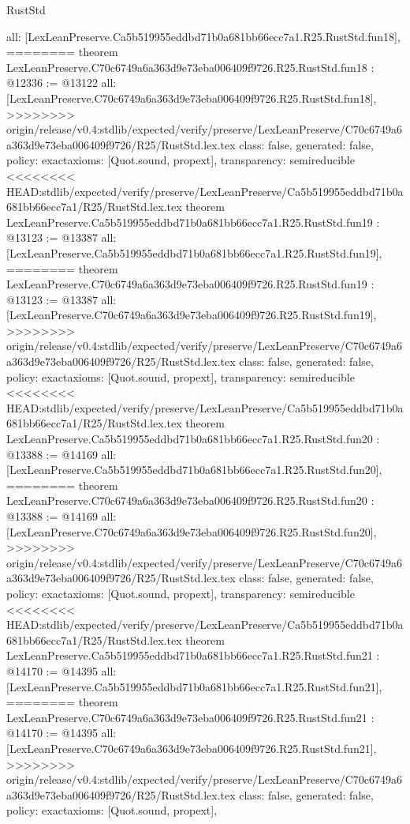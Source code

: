 \begin{lexlean}{RustStd}
\begin{coremodule}
{\begin{coremodule}
{{{{{{{{{{{{{{{{{{{{{  all: [LexLeanPreserve.Ca5b519955eddbd71b0a681bb66ecc7a1.R25.RustStd.fun18],
========
theorem LexLeanPreserve.C70c6749a6a363d9e73eba006409f9726.R25.RustStd.fun18 : @12336 := @13122 {
  all: [LexLeanPreserve.C70c6749a6a363d9e73eba006409f9726.R25.RustStd.fun18],
>>>>>>>> origin/release/v0.4:stdlib/expected/verify/preserve/LexLeanPreserve/C70c6749a6a363d9e73eba006409f9726/R25/RustStd.lex.tex
  class: false,
  generated: false,
  policy: exact{axioms: [Quot.sound, propext]},
  transparency: semireducible
}
<<<<<<<< HEAD:stdlib/expected/verify/preserve/LexLeanPreserve/Ca5b519955eddbd71b0a681bb66ecc7a1/R25/RustStd.lex.tex
theorem LexLeanPreserve.Ca5b519955eddbd71b0a681bb66ecc7a1.R25.RustStd.fun19 : @13123 := @13387 {
  all: [LexLeanPreserve.Ca5b519955eddbd71b0a681bb66ecc7a1.R25.RustStd.fun19],
========
theorem LexLeanPreserve.C70c6749a6a363d9e73eba006409f9726.R25.RustStd.fun19 : @13123 := @13387 {
  all: [LexLeanPreserve.C70c6749a6a363d9e73eba006409f9726.R25.RustStd.fun19],
>>>>>>>> origin/release/v0.4:stdlib/expected/verify/preserve/LexLeanPreserve/C70c6749a6a363d9e73eba006409f9726/R25/RustStd.lex.tex
  class: false,
  generated: false,
  policy: exact{axioms: [Quot.sound, propext]},
  transparency: semireducible
}
<<<<<<<< HEAD:stdlib/expected/verify/preserve/LexLeanPreserve/Ca5b519955eddbd71b0a681bb66ecc7a1/R25/RustStd.lex.tex
theorem LexLeanPreserve.Ca5b519955eddbd71b0a681bb66ecc7a1.R25.RustStd.fun20 : @13388 := @14169 {
  all: [LexLeanPreserve.Ca5b519955eddbd71b0a681bb66ecc7a1.R25.RustStd.fun20],
========
theorem LexLeanPreserve.C70c6749a6a363d9e73eba006409f9726.R25.RustStd.fun20 : @13388 := @14169 {
  all: [LexLeanPreserve.C70c6749a6a363d9e73eba006409f9726.R25.RustStd.fun20],
>>>>>>>> origin/release/v0.4:stdlib/expected/verify/preserve/LexLeanPreserve/C70c6749a6a363d9e73eba006409f9726/R25/RustStd.lex.tex
  class: false,
  generated: false,
  policy: exact{axioms: [Quot.sound, propext]},
  transparency: semireducible
}
<<<<<<<< HEAD:stdlib/expected/verify/preserve/LexLeanPreserve/Ca5b519955eddbd71b0a681bb66ecc7a1/R25/RustStd.lex.tex
theorem LexLeanPreserve.Ca5b519955eddbd71b0a681bb66ecc7a1.R25.RustStd.fun21 : @14170 := @14395 {
  all: [LexLeanPreserve.Ca5b519955eddbd71b0a681bb66ecc7a1.R25.RustStd.fun21],
========
theorem LexLeanPreserve.C70c6749a6a363d9e73eba006409f9726.R25.RustStd.fun21 : @14170 := @14395 {
  all: [LexLeanPreserve.C70c6749a6a363d9e73eba006409f9726.R25.RustStd.fun21],
>>>>>>>> origin/release/v0.4:stdlib/expected/verify/preserve/LexLeanPreserve/C70c6749a6a363d9e73eba006409f9726/R25/RustStd.lex.tex
  class: false,
  generated: false,
  policy: exact{axioms: [Quot.sound, propext]},
}}}}}}}}}}}}}}}}}}}}}}}}}
\end{coremodule}}
\end{coremodule}
\end{lexlean}
